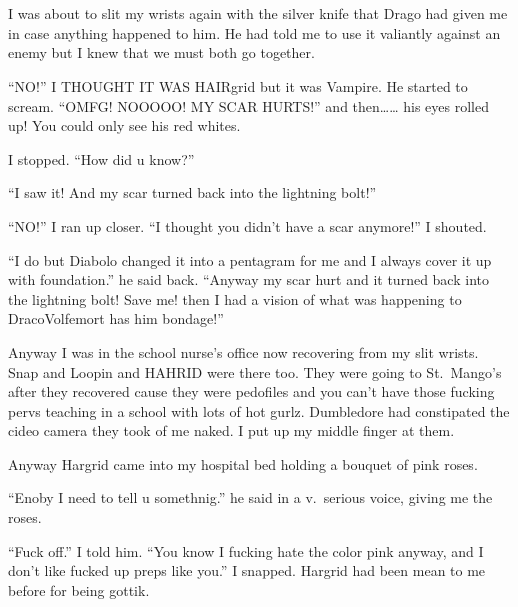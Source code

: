 \section{}



I was about to slit my wrists again with the silver knife that Drago had given me in case anything happened to him. He had told me to use it valiantly against an enemy but I knew that we must both go together.

\enquote{NO\@!} I THOUGHT IT WAS HAIRgrid but it was Vampire. He started to scream. \enquote{OMFG\@! NOOOOO\@! MY SCAR HURTS\@!} and then\ldots{}\ldots{} his eyes rolled up! You could only see his red whites.

I stopped. \enquote{How did u know?}

\enquote{I saw it! And my scar turned back into the lightning bolt!}

\enquote{NO\@!} I ran up closer. \enquote{I thought you didn't have a scar anymore!} I shouted.

\enquote{I do but Diabolo changed it into a pentagram for me and I always cover it up with foundation.} he said back. \enquote{Anyway my scar hurt and it turned back into the lightning bolt! Save me! then I had a vision of what was happening to Draco\dotfill\newline Volfemort has him bondage!}

Anyway I was in the school nurse's office now recovering from my slit wrists. Snap and Loopin and HAHRID were there too. They were going to St.~Mango's after they recovered cause they were pedofiles and you can't have those fucking pervs teaching in a school with lots of hot gurlz. Dumbledore had constipated the cideo camera they took of me naked. I put up my middle finger at them.

Anyway Hargrid came into my hospital bed holding a bouquet of pink roses.

\enquote{Enoby I need to tell u somethnig.} he said in a v.\ serious voice, giving me the roses.

\enquote{Fuck off.} I told him. \enquote{You know I fucking hate the color pink anyway, and I don't like fucked up preps like you.} I snapped. Hargrid had been mean to me before for being gottik.


